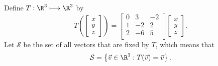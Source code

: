 \documentclass{article}
\begin{document}
Define $T : \R^{3} \longmapsto \R^{3}$ by  
\[
  T\left( \begin{bmatrix} x\\y\\z \end{bmatrix}  \right) = 
  \begin{bmatrix} 
  0 & 3 & -2 \\
  1 & -2 & 2 \\
  2 & -6 & 5 \\
  \end{bmatrix} \begin{bmatrix} x\\y\\z \end{bmatrix} 
.\] 
Let $\mathcal{S}$ be the set of all vectors that are fixed by $T$, which means that
 \[
\mathcal{S}=\left\{ \vec{v}\in \R^{3} : T(\vec{v})=\vec{v} \right\} 
.\] 
\end{document}
